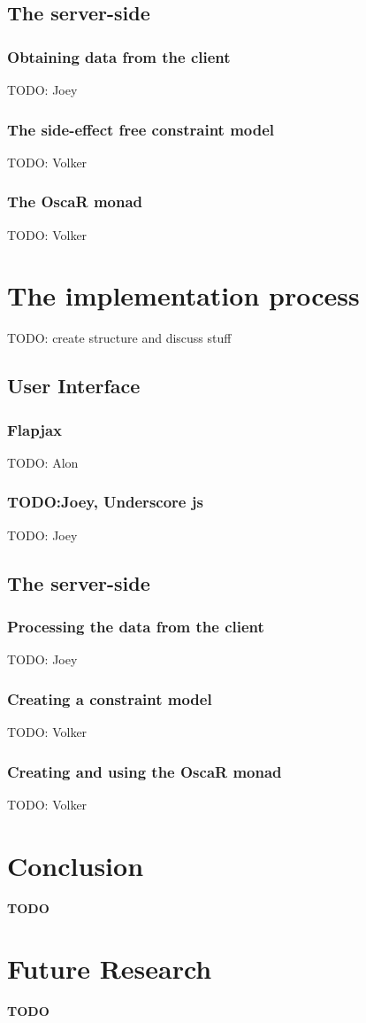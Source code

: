 \documentclass[a4paper]{article}
\begin{document}
\subsection{The server-side}
\label{sec:design-server}
\subsubsection{Obtaining data from the client}
{\Large TODO:} Joey
\subsubsection{The side-effect free constraint model}
{\Large TODO:} Volker
\subsubsection{The OscaR monad}
{\Large TODO:} Volker


\section{The implementation process}
\label{sec:impl}
{\Large TODO:} create structure and discuss stuff

\subsection{User Interface}
\subsubsection{Flapjax}
{\Large TODO:} Alon

\subsubsection{TODO:Joey, Underscore js}
{\Large TODO:} Joey


\subsection{The server-side}
\subsubsection{Processing the data from the client}
{\Large TODO:} Joey

\subsubsection{Creating a constraint model}
{\Large TODO:} Volker

\subsubsection{Creating and using the OscaR monad}
{\Large TODO:} Volker



\section{Conclusion}
\label{sec:conclusion}
\textbf{TODO}


\section{Future Research}
\label{sec:future}
\textbf{TODO}

\printbibliography
\end{document}
